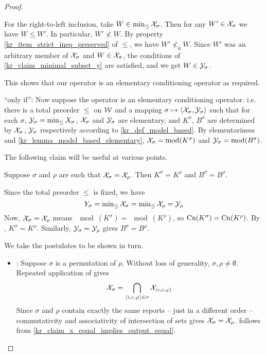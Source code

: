 \begin{proof}
\begin{claimproof}
        For the right-to-left inclusion, take $W \in \min_{\le}{\mathcal{X}_\sigma}$.
        Then for any $W' \in \mathcal{X}_\sigma$ we have $W \le W'$. In particular, $W'
        \not< W$. By property \cref{kr_item_strict_ineq_preserved} of $\le$,
        we have $W' \not<_0 W$. Since $W'$ was an arbitrary member of
        $\mathcal{X}_\sigma$ and $W \in \mathcal{X}_\sigma$, the conditions of
        \cref{kr_claim_minimal_subset_y} are satisfied, and we get $W \in
        \mathcal{Y}_\sigma$.
    \end{claimproof}

This shows that our operator is an elementary conditioning operator as
required.

``only if'': Now  suppose the operator is an elementary conditioning operator.
i.e. there is a total preorder $\le$ on $\mathcal{W}$ and a mapping $\sigma \mapsto
\langle {\mathcal{X}_\sigma, \mathcal{Y}_\sigma} \rangle$ such that for each $\sigma$, $\mathcal{Y}_\sigma =
\min_{\le}{X_\sigma}$, $\mathcal{X}_\sigma$ and $\mathcal{Y}_\sigma$ are elementary, and
$K^\sigma$, $B^\sigma$ are determined by $\mathcal{X}_\sigma$, $\mathcal{Y}_\sigma$ respectively
according to \cref{kr_def_model_based}. By elementariness and
\cref{kr_lemma_model_based_elementary}, $\mathcal{X}_\sigma = \operatorname{mod}(K^\sigma)$ and $\mathcal{Y}_\sigma
= \operatorname{mod}(B^\sigma)$.

The following claim will be useful at various points.

    \begin{claim}
        \label{kr_claim_x_equal_implies_output_equal}
        Suppose $\sigma$ and $\rho$ are such that $\mathcal{X}_\sigma = \mathcal{X}_\rho$. Then
        $K^\sigma = K^\rho$ and $B^\sigma = B^\rho$.
    \end{claim}
    \begin{claimproof}
        Since the total preorder $\le$ is fixed, we have
        \[
            Y_\sigma
            = \min\nolimits_{\le}{\mathcal{X}_\sigma}
            = \min\nolimits_{\le}{\mathcal{X}_\rho}
            = \mathcal{Y}_\rho
        \]
        Now, $\mathcal{X}_\sigma = \mathcal{X}_\rho$ means $\mod(K^\sigma) = \mod(K^\rho)$, so
        $\operatorname{Cn}(K^\sigma) = \operatorname{Cn}(K^\rho)$. By \closure{}, $K^\sigma = K^\rho$.
        Similarly, $\mathcal{Y}_\sigma = \mathcal{Y}_\rho$ gives $B^\sigma = B^\rho$.
    \end{claimproof}

We take the postulates to be shown in turn.

\begin{itemize}
    \item \rearr{}: Suppose $\sigma$ is a permutation of $\rho$.
          Without loss of generality, $\sigma, \rho \ne \emptyset$. Repeated
          application of \kconj{} gives
          \[
            \mathcal{X}_{\sigma} = \bigcap_{\langle {i, c, \varphi} \rangle \in \sigma}{\mathcal{X}_{\langle {i,
            c, \varphi} \rangle}}
          \]
          Since $\sigma$ and $\rho$ contain exactly the same reports -- just in
          a different order -- commutativity and associativity of intersection
          of sets gives $\mathcal{X}_\sigma = \mathcal{X}_\rho$. \rearr{} follows
          from \cref{kr_claim_x_equal_implies_output_equal}.


\end{itemize}
\end{proof}
